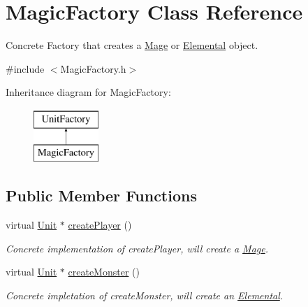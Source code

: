 \hypertarget{class_magic_factory}{}\section{Magic\+Factory Class Reference}
\label{class_magic_factory}


Concrete Factory that creates a \hyperlink{class_mage}{Mage} or \hyperlink{class_elemental}{Elemental} object.  




{\ttfamily \#include $<$Magic\+Factory.\+h$>$}

Inheritance diagram for Magic\+Factory\+:\begin{figure}[H]
\begin{center}
\leavevmode
\includegraphics[height=2.000000cm]{class_magic_factory}
\end{center}
\end{figure}
\subsection*{Public Member Functions}
\begin{DoxyCompactItemize}
\item 
\hypertarget{class_magic_factory_a3021b979bd991e32e311c8869d500b46}{}virtual \hyperlink{class_unit}{Unit} $\ast$ \hyperlink{class_magic_factory_a3021b979bd991e32e311c8869d500b46}{create\+Player} ()\label{class_magic_factory_a3021b979bd991e32e311c8869d500b46}

\begin{DoxyCompactList}\small\item\em Concrete implementation of create\+Player, will create a \hyperlink{class_mage}{Mage}. \end{DoxyCompactList}\item 
\hypertarget{class_magic_factory_aaef72871585cca14e5b847fc44ce3c2b}{}virtual \hyperlink{class_unit}{Unit} $\ast$ \hyperlink{class_magic_factory_aaef72871585cca14e5b847fc44ce3c2b}{create\+Monster} ()\label{class_magic_factory_aaef72871585cca14e5b847fc44ce3c2b}

\begin{DoxyCompactList}\small\item\em Concrete impletation of create\+Monster, will create an \hyperlink{class_elemental}{Elemental}. \end{DoxyCompactList}\end{DoxyCompactItemize}
